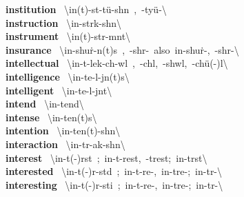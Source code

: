 \documentclass[10pt,a4paper]{article}
\begin{document}
\begin{multicols}{2}
\textbf{ institution }\quad \ \textbackslash \textsecstress in(t)-st\textschwa -\textprimstress t\"{u}-sh\textschwa n\ ,\ -\textprimstress ty\"{u}-\textbackslash \\
\textbf{ instruction }\quad \ \textbackslash in-\textprimstress str\textschwa k-sh\textschwa n\textbackslash \\
\textbf{ instrument }\quad \ \textbackslash \textprimstress in(t)-str\textschwa -m\textschwa nt\textbackslash \\
\textbf{ insurance }\quad \ \textbackslash in-\textprimstress shu\. r-\textschwa n(t)s\ ,\ -\textprimstress sh\textschwa r-\ also\ \textprimstress in-\textsecstress shu\. r-,\ -\textsecstress sh\textschwa r-\textbackslash \\
\textbf{ intellectual }\quad \ \textbackslash \textsecstress in-t\textschwa -\textprimstress lek-ch\textschwa -w\textschwa l\ ,\ -ch\textschwa l,\ -shw\textschwa l,\ -ch\"{u}(-\textschwa )l\textbackslash \\
\textbf{ intelligence }\quad \ \textbackslash in-\textprimstress te-l\textschwa -j\textschwa n(t)s\textbackslash \\
\textbf{ intelligent }\quad \ \textbackslash in-\textprimstress te-l\textschwa -j\textschwa nt\textbackslash \\
\textbf{ intend }\quad \ \textbackslash in-\textprimstress tend\textbackslash \\
\textbf{ intense }\quad \ \textbackslash in-\textprimstress ten(t)s\textbackslash \\
\textbf{ intention }\quad \ \textbackslash in-\textprimstress ten(t)-sh\textschwa n\textbackslash \\
\textbf{ interaction }\quad \ \textbackslash \textsecstress in-t\textschwa r-\textprimstress ak-sh\textschwa n\textbackslash \\
\textbf{ interest }\quad \ \textbackslash \textprimstress in-t(\textschwa -)r\textschwa st\ ;\ \textprimstress in-t\textschwa -\textsecstress rest,\ -\textsecstress trest;\ \textprimstress in-t\textschwa rst\textbackslash \\
\textbf{ interested }\quad \ \textbackslash \textprimstress in-t(\textschwa -)r\textschwa -st\textschwa d\ ;\ \textprimstress in-t\textschwa -\textsecstress re-,\ \textprimstress in-\textsecstress tre-;\ \textprimstress in-t\textschwa r-\textbackslash \\
\textbf{ interesting }\quad \ \textbackslash \textprimstress in-t(\textschwa -)r\textschwa -sti\engma \ ;\ \textprimstress in-t\textschwa -\textsecstress re-,\ \textprimstress in-\textsecstress tre-;\ \textprimstress in-t\textschwa r-\textbackslash \\

\end{multicols}
\end{document}
